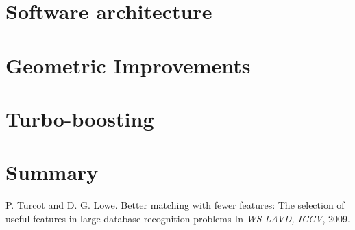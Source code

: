 \documentclass[11pt, onecolumn, a4paper, final]{report} %
\begin{document}
\chapter{Software architecture}
\label{chpt:architecture}


\chapter{Geometric Improvements}
\label{chpt:geoimprovements}


\chapter{Turbo-boosting}
\label{chpt:turboboosting}


\chapter{Summary}


\begin{thebibliography}{99}

		P. Turcot and D. G. Lowe.
		Better matching with fewer features: The selection of useful features in large database recognition problems
		In \emph{WS-LAVD, ICCV}, 2009.
	  
\end{thebibliography}
\end{document}
